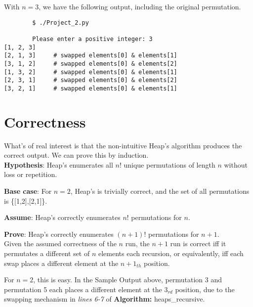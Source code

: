 \documentclass{article}
\begin{document}
With \(n=3\), we have the following output, including the original permutation.

\begin{center}
	\begin{minipage}{0.7\linewidth}
    	\begin{commandline}
			\begin{verbatim}
		$ ./Project_2.py

		Please enter a positive integer: 3
[1, 2, 3]     
[2, 1, 3]     # swapped elements[0] & elements[1]
[3, 1, 2]     # swapped elements[0] & elements[2]
[1, 3, 2]     # swapped elements[0] & elements[1]
[2, 3, 1]     # swapped elements[0] & elements[2]
[3, 2, 1]     # swapped elements[0] & elements[1]        
			\end{verbatim}
		\end{commandline}
	\end{minipage}
\end{center}



\section{Correctness}

What's of real interest is that the non-intuitive Heap's algorithm produces the correct output. We can prove this by induction.\\

\textbf{Hypothesis}: Heap's enumerates all \(n!\) unique permutations of length \(n\) without loss or repetition.

\textbf{Base case}: For \(n=2\), Heap's is trivially correct, and the set of all permutations is \{[1,2],[2,1]\}.

\textbf{Assume}: Heap's correctly enumerates \(n!\) permutations for \(n\).

\textbf{Prove}: Heap's correctly enumerates \((n+1)!\) permutations for \(n+1\).\\

Given the assumed correctness of the \(n\) run, the \(n+1\) run is correct iff it permutates a different set of \(n\) elements each recursion, or equivalently, iff each swap places a different element at the \(n+1_{th}\) position. 

For \(n=2\), this is easy. In the Sample Output above, permutation 3 and permutation 5 each places a different element at the \(3_{rd}\) position, due to the swapping mechanism in \textit{lines 6-7} of \textbf{Algorithm:} heaps\_recursive.
\end{document}
